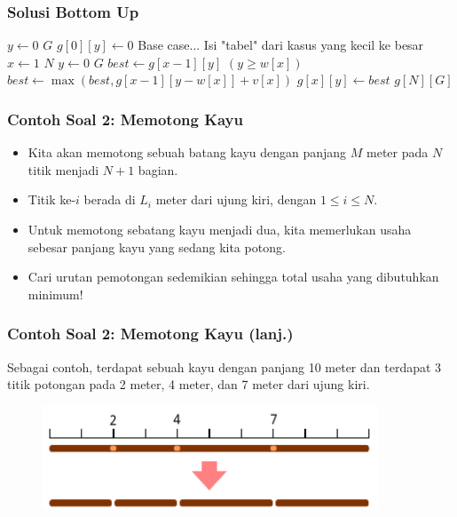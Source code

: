 \begin{frame}
\frametitle{Solusi Bottom Up}
\begin{codebox}
\li \For $y \gets 0$ \To $G$ \Do
\li   $g[0][y] \gets 0$ \Comment Base case...
    \End
\zi
\li \Comment Isi "tabel" dari kasus yang kecil ke besar
\li \For $x \gets 1$ \To $N$ \Do
\li   \For $y \gets 0$ \To $G$ \Do
\li     $best \gets g[x-1][y]$
\li     \If $(y \geq w[x])$ \Then
\li       $best \gets \max(best, g[x - 1][y-w[x]] + v[x])$
        \End  
\li     $g[x][y] \gets best$
      \End
    \End    
\li \Return $g[N][G]$
    \End
\end{codebox}
\end{frame}

\begin{frame}
\frametitle{Contoh Soal 2: Memotong Kayu }
\begin{itemize}
  \item Kita akan memotong sebuah batang kayu dengan panjang $M$ meter pada $N$ titik menjadi $N+1$ bagian.
  \item Titik ke-$i$ berada di $L_i$ meter dari ujung kiri, dengan $1 \leq i \leq N$.
  \item Untuk memotong sebatang kayu menjadi dua, kita memerlukan usaha \alert{sebesar panjang kayu yang sedang kita potong}.
  \item Cari urutan pemotongan sedemikian sehingga total usaha yang dibutuhkan minimum!
\end{itemize}
\end{frame}

\begin{frame}
\frametitle{Contoh Soal 2: Memotong Kayu (lanj.)}
Sebagai contoh, terdapat sebuah kayu dengan panjang 10 meter dan terdapat 3 titik potongan pada 2 meter, 4 meter, dan 7 meter dari ujung kiri.
\begin{figure}
  \includegraphics[width=10cm]{asset/cutting-stick-1.pdf}
\end{figure}
\end{frame}

